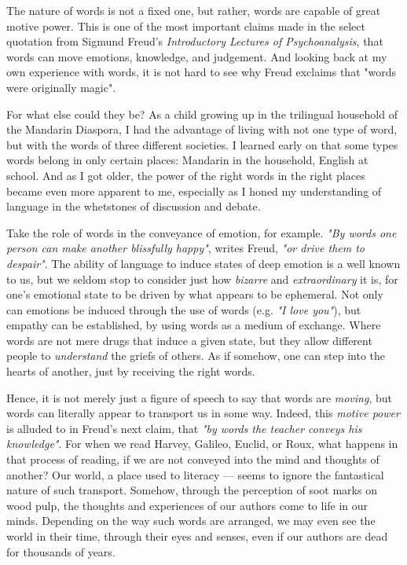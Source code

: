 The nature of words is not a fixed one, but rather, words are capable of great motive power. This is one of the most important claims made in the select quotation from Sigmund Freud's \emph{Introductory Lectures of Psychoanalysis}, that words can move emotions, knowledge, and judgement. And looking back at my own experience with words, it is not hard to see why Freud exclaims that "words were originally magic".

\noindent
For what else could they be? As a child growing up in the trilingual household of the Mandarin Diaspora, I had the advantage of living with not one type of word, but with the words of three different societies. I learned early on that some types words belong in only certain places: Mandarin in the household, English at school. And as I got older, the power of the right words in the right places became even more apparent to me, especially as I honed my understanding of language in the whetstones of discussion and debate.

Take the role of words in the conveyance of emotion, for example. \emph{"By words one person can make another blissfully happy"}, writes Freud, \emph{"or drive them to despair"}. The ability of language to induce states of deep emotion is a well known to us, but we seldom stop to consider just how \emph{bizarre} and \emph{extraordinary} it is, for one's emotional state to be driven by what appears to be ephemeral. Not only can emotions be induced through the use of words (e.g. \emph{"I love you"}), but empathy can be established, by using words as a medium of exchange. Where words are not mere drugs that induce a given state, but they allow different people to \emph{understand} the griefs of others. As if somehow, one can step into the hearts of another, just by receiving the right words.

Hence, it is not merely just a figure of speech to say that words are \emph{moving}, but words can literally appear to transport us in some way. Indeed, this \emph{motive power} is alluded to in Freud's next claim, that \emph{"by words the teacher \emph{conveys} his knowledge"}. For when we read Harvey, Galileo, Euclid, or Roux, what happens in that process of reading, if we are not conveyed into the mind and thoughts of another? Our world, a place used to literacy --- seems to ignore the fantastical nature of such transport. Somehow, through the perception of soot marks on wood pulp, the thoughts and experiences of our authors come to life in our minds. Depending on the way such words are arranged, we may even see the world in their time, through their eyes and senses, even if our authors are dead for thousands of years.


